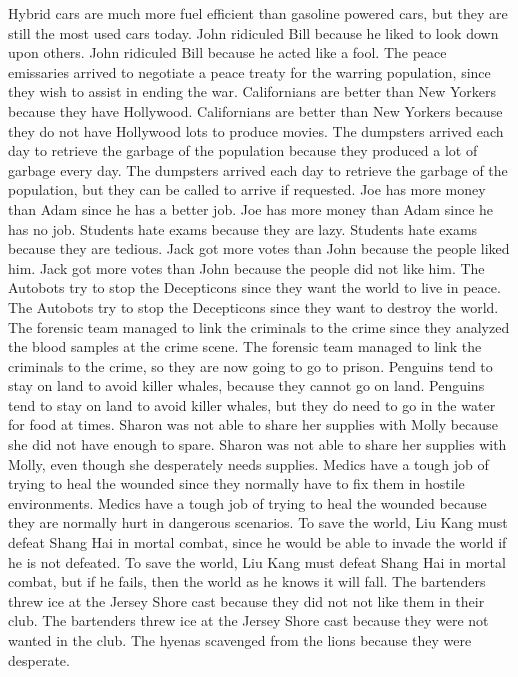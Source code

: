 \documentclass{article}
\begin{document}
\begin{enumerate}
Hybrid cars are much more fuel efficient than gasoline powered cars, but they are still the most used cars today.
John ridiculed Bill because he liked to look down upon others.
John ridiculed Bill because he acted like a fool.
The peace emissaries arrived to negotiate a peace treaty for the warring population, since they wish to assist in ending the war.
Californians are better than New Yorkers because they have Hollywood.
Californians are better than New Yorkers because they do not have Hollywood lots to produce movies.
The dumpsters arrived each day to retrieve the garbage of the population because they produced a lot of garbage every day.
The dumpsters arrived each day to retrieve the garbage of the population, but they can be called to arrive if requested.
Joe has more money than Adam since he has a better job.
Joe has more money than Adam since he has no job.
Students hate exams because they are lazy.
Students hate exams because they are tedious.
Jack got more votes than John because the people liked him.
Jack got more votes than John because the people did not like him.
The Autobots try to stop the Decepticons since they want the world to live in peace.
The Autobots try to stop the Decepticons since they want to destroy the world.
The forensic team managed to link the criminals to the crime since they analyzed the blood samples at the crime scene.
The forensic team managed to link the criminals to the crime, so they are now going to go to prison.
Penguins tend to stay on land to avoid killer whales, because they cannot go on land.
Penguins tend to stay on land to avoid killer whales, but they do need to go in the water for food at times.
Sharon was not able to share her supplies with Molly because she did not have enough to spare.
Sharon was not able to share her supplies with Molly, even though she desperately needs supplies.
Medics have a tough job of trying to heal the wounded since they normally have to fix them in hostile environments.
Medics have a tough job of trying to heal the wounded because they are normally hurt in dangerous scenarios.
To save the world, Liu Kang must defeat Shang Hai in mortal combat, since he would be able to invade the world if he is not defeated.
To save the world, Liu Kang must defeat Shang Hai in mortal combat, but if he fails, then the world as he knows it will fall.
The bartenders threw ice at the Jersey Shore cast because they did not not like them in their club.
The bartenders threw ice at the Jersey Shore cast because they were not wanted in the club.
The hyenas scavenged from the lions because they were desperate.

\end{enumerate}
\end{document}
